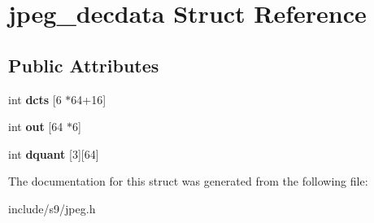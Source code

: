 \hypertarget{structjpeg__decdata}{\section{jpeg\-\_\-decdata Struct Reference}
\label{structjpeg__decdata}
}
\subsection*{Public Attributes}
\begin{DoxyCompactItemize}
\item 
\hypertarget{structjpeg__decdata_a165326c644e86f3548801f1d6fae9ec3}{int {\bfseries dcts} \mbox{[}6 $\ast$64+16\mbox{]}}\label{structjpeg__decdata_a165326c644e86f3548801f1d6fae9ec3}

\item 
\hypertarget{structjpeg__decdata_adb74d2eebb2bb629808ed94779612f8f}{int {\bfseries out} \mbox{[}64 $\ast$6\mbox{]}}\label{structjpeg__decdata_adb74d2eebb2bb629808ed94779612f8f}

\item 
\hypertarget{structjpeg__decdata_a18f535c0ce912b8e9d04aa4aed9c4d1c}{int {\bfseries dquant} \mbox{[}3\mbox{]}\mbox{[}64\mbox{]}}\label{structjpeg__decdata_a18f535c0ce912b8e9d04aa4aed9c4d1c}

\end{DoxyCompactItemize}


The documentation for this struct was generated from the following file\-:\begin{DoxyCompactItemize}
\item 
include/s9/jpeg.\-h\end{DoxyCompactItemize}

